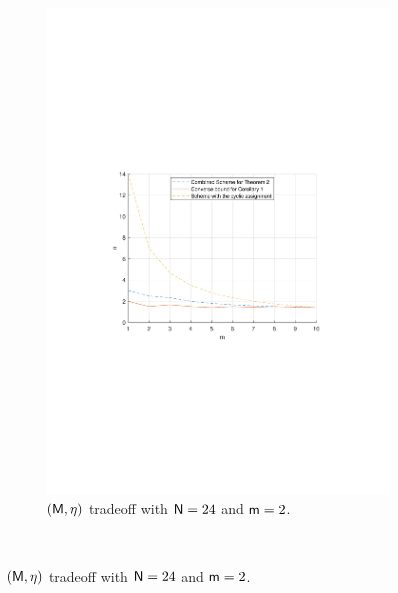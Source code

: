 \documentclass[conference,letterpaper]{IEEEtran}
\begin{document}
\begin{figure}[ht] 
    \centering
    \iffalse
    \begin{subfigure}[t]{0.5\textwidth}
        \centering
        \includegraphics[scale=0.45]{M varies.pdf}
        \caption{\small $({\sf M},\eta)$ tradeoff with ${\sf N}=24$ and ${\sf m}=2$.}
        \label{fig:numerical 1a}
    \end{subfigure}\\


\end{figure}
\end{document}
